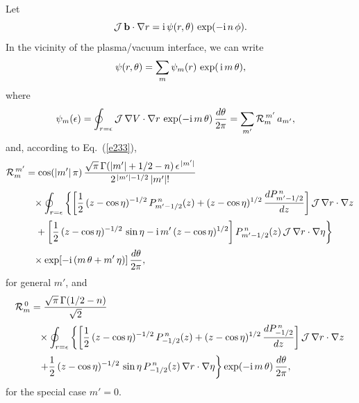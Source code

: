 \documentclass[12pt,prb,aps]{revtex4-1}
\begin{document}
Let
\begin{equation}\label{ebnm}
{\cal J}\,{\bf b}\cdot\nabla r = {\rm i}\,\psi(r,\theta)\,\exp(-{\rm i}\,n\,\phi).
\end{equation}
In the vicinity of the plasma/vacuum interface, we can write
\begin{equation}\label{ebnm1}
\psi(r,\theta) = \sum_m \psi_m(r)\,\exp(\,{\rm i}\,m\,\theta),
\end{equation}
where
\begin{align}\label{e352}
\psi_m(\epsilon)&= \oint_{r=\epsilon}{\cal J}\,\nabla V\cdot \nabla r\,\exp(-{\rm i}\,m\,\theta)\,\frac{d\theta}{2\pi}= \sum_{m'}{\cal R}_m^{\,m'}\,a_{m'},
\end{align}
and,  according to Eq.~(\ref{e233}), 
\begin{align}\label{e354}
{\cal R}_m^{\,m'} &=\cos(|m'|\,\pi)\,
\frac{\sqrt{\pi}\,\Gamma(|m'|+1/2-n)\,\epsilon^{\,|m'|}}{2^{\,|m'|-1/2}\,|m'|!}
\nonumber\\[0.5ex]&\phantom{=}\times \oint_{r=\epsilon}
\left\{\left[\frac{1}{2}\,(z-\cos\eta)^{-1/2}\,P_{m'-1/2}^{\,n}(z)+(z-\cos\eta)^{1/2}\,\frac{dP_{m'-1/2}^{\,n}}{dz}\right]{\cal J}\,\nabla r\cdot \nabla z
\right.\nonumber\\[0.5ex]&
\left.\phantom{=}+\left[\frac{1}{2}\,(z-\cos\eta)^{-1/2}\,\sin\eta-{\rm i}\,m'\,(z-\cos\eta)^{1/2}\right]P_{m'-1/2}^{\,n}(z)\,{\cal J}\,\nabla r\cdot \nabla \eta
\right\}\nonumber\\[0.5ex] &
\phantom{=}\times\exp[-{\rm i}\,(m\,\theta+m'\,\eta)]\,\frac{d\theta}{2\pi},
\end{align}
for general $m'$, and 
\begin{align}\label{e356}
{\cal R}_m^{\,0} &=
\frac{\sqrt{\pi}\,\Gamma(1/2-n)}{\sqrt{2}}
\nonumber\\[0.5ex]&\phantom{=}\times \oint_{r=\epsilon}
\left\{\left[\frac{1}{2}\,(z-\cos\eta)^{-1/2}\,P_{-1/2}^{\,n}(z)+(z-\cos\eta)^{1/2}\,\frac{dP_{-1/2}^{\,n}}{dz}\right]{\cal J}\,\nabla r \cdot\nabla z
\right.\nonumber\\[0.5ex]&
\phantom{=}\left.+\frac{1}{2}\,(z-\cos\eta)^{-1/2}\,\sin\eta\,P_{-1/2}^{\,n}(z)\,\nabla r \cdot \nabla \eta
\right\}\exp(-{\rm i}\,m\,\theta)\,\frac{d\theta}{2\pi},
\end{align}
for the special case $m'=0$.
\end{document}
